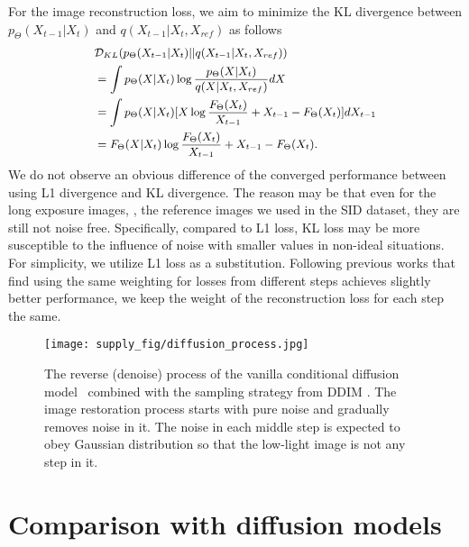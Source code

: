 \documentclass[10pt,twocolumn,letterpaper]{article}
\newcommand{\D}[2]{\mathcal{D}_{KL}(#1||#2)}
\def\p{p_\Theta}
\def\F{F_{\Theta}}
\begin{document}
For the image reconstruction loss, we aim to minimize the KL divergence between $\p(X_{t-1}|X_t)$ and $q(X_{t-1}|X_t, X_{ref})$ as follows
\begin{equation*} 
\small
\begin{split}
    &\D{\p(X_{t-1}|X_t)}{q(X_{t-1}|X_t, X_{ref})} \\
    &= \int \p(X|X_t) \log \frac{\p(X|X_t)}{q(X|X_t, X_{ref})} dX\\
    &=\int \p(X|X_t) [X \log \frac{\F(X_t)}{X_{t-1}} + X_{t-1} - \F(X_t)] dX_{t-1} \\
    &= \F(X|X_t) \log \frac{\F(X_t)}{X_{t-1}} + X_{t-1} - \F(X_t).
\end{split}
\end{equation*}
We do not observe an obvious difference of the converged performance between using L1 divergence and KL divergence. The reason may be that even for the long exposure images, \eg, the reference images we used in the SID dataset, they are still not noise free. Specifically, compared to L1 loss, KL loss may be more susceptible to the influence of noise with smaller values in non-ideal situations. For simplicity, we utilize L1 loss as a substitution.
Following previous works that find using the same weighting for losses from different steps achieves slightly better performance, we keep the weight of the reconstruction loss for each step the same.


\begin{figure}[t]
    \centering
    \texttt{[image: supply\_fig/diffusion\_process.jpg]}
    \caption{The reverse (denoise) process of the vanilla conditional diffusion model~\cite{saharia2022image} combined with the sampling strategy from DDIM \cite{song2020denoising}. The image restoration process starts with pure noise and gradually removes noise in it. The noise in each middle step is expected to obey Gaussian distribution so that the low-light image is not any step in it.}
    \label{fig:diffusion_x0}
\end{figure}

\section{Comparison with diffusion models}
\end{document}
